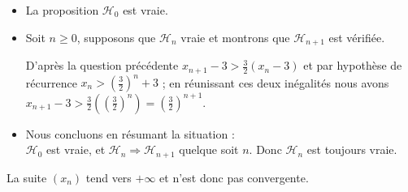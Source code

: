 {\begin{enumerate}
{\begin{itemize}
\item[$\bullet$] La proposition $\mathcal{H}_0$ est vraie.
\item[$\bullet$] Soit $n\geq 0$, supposons que $\mathcal{H}_n$ vraie et montrons
que $\mathcal{H}_{n+1}$ est v\'erifi\'ee.

D'apr\`es la question pr\'ec\'edente $ x_{n+1}-3 >
\frac{3}{2}(x_n-3)$ et par hypoth\`ese de r\'ecurrence $x_n
>\left( \frac{3}{2}\right)^n+3$ ; en r\'eunissant ces deux
in\'egalit\'es nous avons $ x_{n+1}-3 >
\frac{3}{2}(\left(\frac{3}{2}\right)^n) =
\left(\frac{3}{2}\right)^{n+1}$.
\item[$\bullet$] Nous concluons en r\'esumant la situation :\\
$\mathcal{H}_{0}$ est vraie, et $\mathcal{H}_{n} \Rightarrow
\mathcal{H}_{n+1}$ quelque soit $n$. Donc $\mathcal{H}_{n}$ est
toujours vraie.
\end{itemize}
La suite $(x_n)$ tend vers $+\infty$ et n'est donc pas convergente.
}
\end{enumerate}
}
